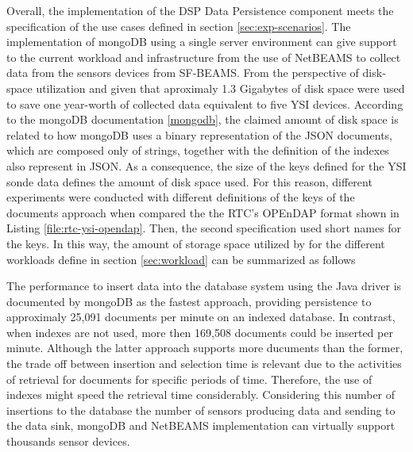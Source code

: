 Overall, the implementation of the DSP Data Persistence component meets
the specification of the use cases defined in section \ref{sec:exp-scenarios}.
The implementation of mongoDB using a single server environment can give
support to the current workload and infrastructure from the use of NetBEAMS to
collect data from the sensors devices from SF-BEAMS. From the perspective of
disk-space utilization and given that aproximaly 1.3 Gigabytes of disk space
were used to save one year-worth of collected data equivalent to five YSI
devices. According to the mongoDB documentation \ref{mongodb}, the claimed
amount of disk space is related to how mongoDB uses a binary representation
of the JSON documents, which are composed only of strings, together with the
definition of the indexes also represent in JSON. As a consequence, the size of
the keys defined for the YSI sonde data defines the amount of disk space used.
For this reason, different experiments were conducted with different
definitions of the keys of the documents
approach when compared the the RTC's OPEnDAP format shown in Listing
\ref{file:rtc-ysi-opendap}. Then, the second specification used short names
for the keys. In this way, the amount of storage space utilized by for the
different workloads define in section \ref{sec:workload} can be summarized as
follows

The performance to insert data into the database system using the Java driver
is documented by mongoDB as the fastest approach, providing persistence to
approximaly 25,091 documents per minute on an indexed database. In contrast,
when indexes are not used, more then 169,508 documents could be inserted per
minute. Although the latter approach supports more ducuments than the former,
the trade off between insertion and selection time is relevant due to the
activities of retrieval for documents for specific periods of time. Therefore,
the use of indexes might speed the retrieval time considerably. Considering
this number of insertions to the database the number of sensors producing data
and sending to the data sink, mongoDB and NetBEAMS implementation can
virtually support thousands sensor devices.

